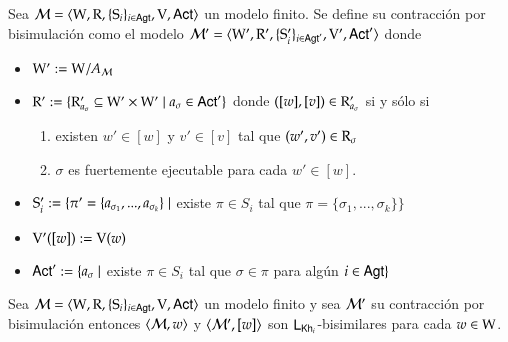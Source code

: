 \begin{definicion}
    Sea $\model=\tup{\W,\R,\cset{\S_i}_{i \in \AGT},\V,\ACT}$ un modelo finito. Se define su contracción por bisimulación como el modelo $\model'=\tup{\W',\R',\cset{\S_i'}_{i \in \AGT'},\V',\ACT'}$ donde 
    \begin{center}
        \begin{itemize}
            \item $\W' := \W/A_\modults$
            \item $\R' := \{\R'_{a_\sigma} \subseteq \W' \times \W' \mid a_\sigma \in \ACT'\}$ donde $([w],[v]) \in \R'_{a_\sigma}$ si y sólo si
            \begin{enumerate}
                \item existen $w' \in [w]$ y $v' \in [v]$ tal que $(w',v')\in \R_\sigma$
                \item $\sigma$ es fuertemente ejecutable para cada $w' \in [w]$.
            \end{enumerate}
            \item $\S_i' := \{ \pi' = \{a_{\sigma_1},...,a_{\sigma_k}\} \mid  
            $ existe $ \pi \in S_i $ tal que $ \pi = \{\sigma_1,...,\sigma_k
            \}\}$
            \item $\V'([w]) := \V(w)$
            \item $\ACT' := \{a_\sigma \mid $ existe $ \pi\in S_i$ tal que $ \sigma \in \pi$ para algún $i \in \AGT \}$ 
        \end{itemize}
    \end{center}
\end{definicion}
    
\begin{teorema}
    Sea $\model=\tup{\W,\R,\cset{\S_i}_{i \in \AGT},\V,\ACT}$ un modelo finito y sea $\modults'$ su contracción por bisimulación entonces $\tup{\modults,w}$ y $\tup{\modults',[w]}$ son $\KHilogic$-bisimilares para cada $w \in \W$.
\end{teorema}

